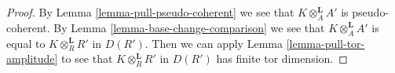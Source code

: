 \documentclass[10pt,a4paper]{amsart}
\theoremstyle{plain}
\theoremstyle{definition}
\theoremstyle{remark}
\numberwithin{equation}{subsection}
\begin{document}
\begin{proof}
By Lemma \ref{lemma-pull-pseudo-coherent} we see that
$K \otimes_A^\mathbf{L} A'$ is pseudo-coherent.
By Lemma \ref{lemma-base-change-comparison} we see that
$K \otimes_A^\mathbf{L} A'$ is equal to $K \otimes_R^\mathbf{L} R'$ in $D(R')$.
Then we can apply Lemma \ref{lemma-pull-tor-amplitude}
to see that $K \otimes_R^\mathbf{L} R'$ in $D(R')$ has finite
tor dimension.
\end{proof}
\end{document}
